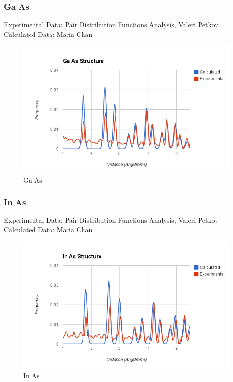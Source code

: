 \documentclass[12pt,letterpaper]{article}
\begin{document}
\subsubsection{Ga As}
\noindent Experimental Data: Pair Distribution Functions Analysis, Valeri
Petkov\\
\noindent Calculated Data: Maria Chan\\
\begin{figure}[h]
  \begin{center}
    \includegraphics[scale=0.7]{figs/gaas_rdf_comparison.png}
    \caption{Ga As}
  \end{center}
\end{figure}

\subsubsection{In As}
\noindent Experimental Data: Pair Distribution Functions Analysis, Valeri
Petkov\\
\noindent Calculated Data: Maria Chan\\
\begin{figure}[h]
  \begin{center}
    \includegraphics[scale=0.7]{figs/inas_rdf_comparison.png}
    \caption{In As}
  \end{center}
\end{figure}
\end{document}
